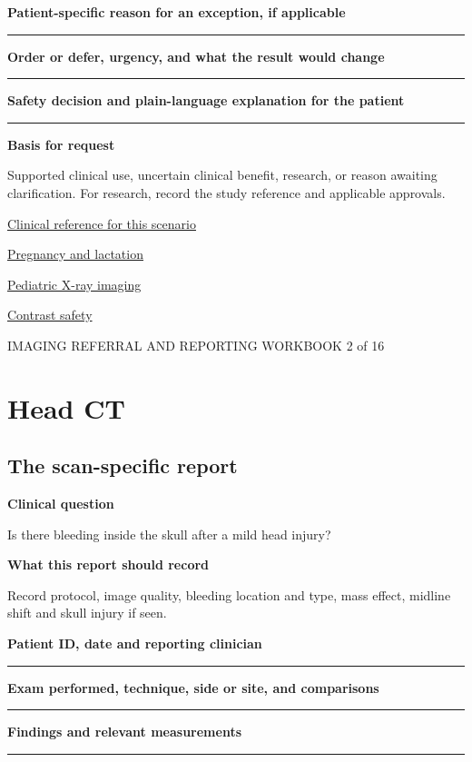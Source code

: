 \documentclass[11pt,a4paper]{article}
\newcommand{\record}[1]{\textbf{#1}\par\vspace{0.55\baselineskip}\hrule\vspace{0.35\baselineskip}}
\begin{document}
\record{Patient-specific reason for an exception, if applicable}

\record{Order or defer, urgency, and what the result would change}

\record{Safety decision and plain-language explanation for the patient}

\textbf{Basis for request}\par Supported clinical use, uncertain clinical benefit, research, or reason awaiting clarification. For research, record the study reference and applicable approvals.\par

\small\href{https://acsearch.acr.org/docs/69481/Narrative}{Clinical reference for this scenario}

\quad\href{https://pubmed.ncbi.nlm.nih.gov/28937575/}{Pregnancy and lactation}

\quad\href{https://www.fda.gov/radiation-emitting-products/medical-imaging/pediatric-x-ray-imaging}{Pediatric X-ray imaging}

\quad\href{https://www.acr.org/clinical-resources/clinical-tools-and-reference/contrast-manual}{Contrast safety}

\normalsize

\newpage

{\small IMAGING REFERRAL AND REPORTING WORKBOOK \hfill 2 of 16}

\section*{Head CT}

\subsection*{The scan-specific report}

\textbf{Clinical question}\par Is there bleeding inside the skull after a mild head injury?\par

\textbf{What this report should record}\par Record protocol, image quality, bleeding location and type, mass effect, midline shift and skull injury if seen.\par

\record{Patient ID, date and reporting clinician}

\record{Exam performed, technique, side or site, and comparisons}

\record{Findings and relevant measurements}
\end{document}

